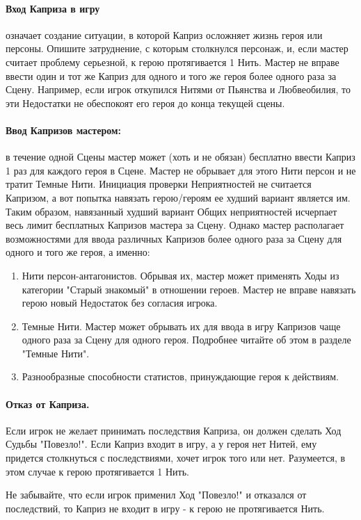 \paragraph{Вход Каприза в игру} означает создание ситуации, в которой Каприз осложняет жизнь героя или персоны. Опишите затруднение, с которым столкнулся персонаж, и, если мастер считает проблему серьезной, к герою протягивается 1 Нить. 
\newline Мастер не вправе ввести один и тот же Каприз для одного и того же героя более одного раза за Сцену. Например, если игрок откупился Нитями от Пьянства и Любвеобилия, то эти Недостатки не обеспокоят его героя до конца текущей сцены.

\paragraph{Ввод Капризов мастером:} в течение одной Сцены мастер может (хоть и не обязан) бесплатно ввести Каприз 1 раз для каждого героя в Сцене. Мастер не обрывает для этого Нити персон и не тратит Темные Нити.
\newline Инициация проверки Неприятностей не считается Капризом, а вот попытка навязать герою/героям ее худший вариант является им. Таким образом, навязанный худший вариант Общих неприятностей исчерпает весь лимит бесплатных Капризов мастера за Сцену.
\newline Однако мастер располагает возможностями для ввода различных Капризов более одного раза за Сцену для одного и того же героя, а именно: 
\begin{enumerate}
    \item Нити персон-антагонистов. Обрывая их, мастер может применять Ходы из категории "Старый знакомый" в отношении героев. Мастер не вправе навязать герою новый Недостаток без согласия игрока.
    \item Темные Нити. Мастер может обрывать их для ввода в игру Капризов чаще одного раза за Сцену для одного героя. Подробнее читайте об этом в разделе "Темные Нити".
    \item Разнообразные способности статистов, принуждающие героя к действиям.
\end{enumerate}
\paragraph{Отказ от Каприза.} Если игрок не желает принимать последствия Каприза, он должен сделать Ход Судьбы "Повезло!". Если Каприз входит в игру, а у героя нет Нитей, ему придется столкнуться с последствиями, хочет игрок того или нет. Разумеется, в этом случае к герою протягивается 1 Нить. 
\begin{tcolorbox}
	Не забывайте, что если игрок применил Ход "Повезло!" и отказался от последствий, то Каприз не входит в игру - к герою не протягивается Нить. 
\end{tcolorbox}

